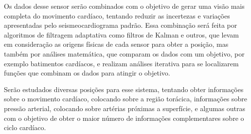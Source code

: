     Os dados desse sensor serão combinados com o objetivo de gerar uma visão mais completa do movimento cardíaco, tentando reduzir as incertezas e variações apresentadas pelo seismeocardiograma padrão. Essa combinação será feita por algoritmos de filtragem adaptativa como filtros de Kalman e outros, que levam em consideração as origens físicas de cada sensor para obter a posição, mas também por análises matemática, que comparam os dados com um objetivo, por exemplo batimentos cardíacos, e realizam análises iterativa para se localizarem funções que combinam os dados para atingir o objetivo.

    Serão estudados diversas posições para esse sistema, tentando obter informações sobre o movimento cardíaco, colocando sobre a região torácica, informações sobre pressão arterial, colocando sobre artérias próximas a superfície, e algumas outras com o objetivo de obter o maior número de informações complementares sobre o ciclo cardíaco.
